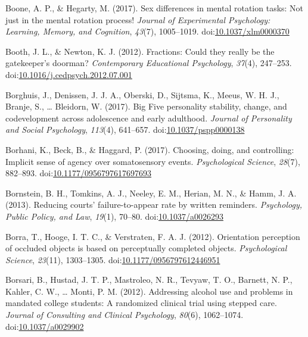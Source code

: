 \documentclass[english,man]{apa6}
\begin{document}
\hypertarget{ref-Boone2017}{}
Boone, A. P., \& Hegarty, M. (2017). Sex differences in mental rotation
tasks: Not just in the mental rotation process! \emph{Journal of
Experimental Psychology: Learning, Memory, and Cognition}, \emph{43}(7),
1005--1019.
doi:\href{https://doi.org/10.1037/xlm0000370}{10.1037/xlm0000370}

\hypertarget{ref-Booth2012}{}
Booth, J. L., \& Newton, K. J. (2012). Fractions: Could they really be
the gatekeeper's doorman? \emph{Contemporary Educational Psychology},
\emph{37}(4), 247--253.
doi:\href{https://doi.org/10.1016/j.cedpsych.2012.07.001}{10.1016/j.cedpsych.2012.07.001}

\hypertarget{ref-Borghuis2017}{}
Borghuis, J., Denissen, J. J. A., Oberski, D., Sijtsma, K., Meeus, W. H.
J., Branje, S., \ldots{} Bleidorn, W. (2017). Big Five personality
stability, change, and codevelopment across adolescence and early
adulthood. \emph{Journal of Personality and Social Psychology},
\emph{113}(4), 641--657.
doi:\href{https://doi.org/10.1037/pspp0000138}{10.1037/pspp0000138}

\hypertarget{ref-Borhani2017}{}
Borhani, K., Beck, B., \& Haggard, P. (2017). Choosing, doing, and
controlling: Implicit sense of agency over somatosensory events.
\emph{Psychological Science}, \emph{28}(7), 882--893.
doi:\href{https://doi.org/10.1177/0956797617697693}{10.1177/0956797617697693}

\hypertarget{ref-Bornstein2013}{}
Bornstein, B. H., Tomkins, A. J., Neeley, E. M., Herian, M. N., \& Hamm,
J. A. (2013). Reducing courts' failure-to-appear rate by written
reminders. \emph{Psychology, Public Policy, and Law}, \emph{19}(1),
70--80. doi:\href{https://doi.org/10.1037/a0026293}{10.1037/a0026293}

\hypertarget{ref-Borra2012}{}
Borra, T., Hooge, I. T. C., \& Verstraten, F. A. J. (2012). Orientation
perception of occluded objects is based on perceptually completed
objects. \emph{Psychological Science}, \emph{23}(11), 1303--1305.
doi:\href{https://doi.org/10.1177/0956797612446951}{10.1177/0956797612446951}

\hypertarget{ref-Borsari2012}{}
Borsari, B., Hustad, J. T. P., Mastroleo, N. R., Tevyaw, T. O., Barnett,
N. P., Kahler, C. W., \ldots{} Monti, P. M. (2012). Addressing alcohol
use and problems in mandated college students: A randomized clinical
trial using stepped care. \emph{Journal of Consulting and Clinical
Psychology}, \emph{80}(6), 1062--1074.
doi:\href{https://doi.org/10.1037/a0029902}{10.1037/a0029902}
\end{document}
